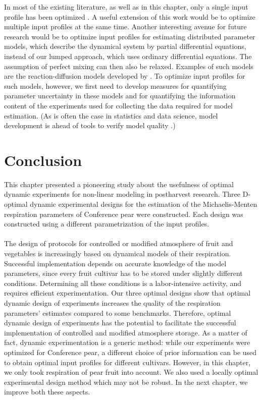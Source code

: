 In most of the existing literature, as well as in this chapter, only a single input profile has been optimized \parencite{bernaerts1,bernaerts2,balsa1,balsa2,nahor1,nahor2}. A useful extension of this work would be to optimize multiple input profiles at the same time. Another interesting avenue for future research would be to optimize input profiles for estimating distributed parameter models, which describe the dynamical system by partial differential equations, instead of our lumped approach, which uses ordinary differential equations. {\color{red}The assumption of perfect mixing can then also be relaxed.} Examples of such models are the reaction-diffusion models developed by \textcite{tri2}. To optimize input profiles for such models, however, we first need to develop measures for quantifying parameter uncertainty in these models and for quantifying the information content of the experiments used for collecting the data required for model estimation. (As is often the case in statistics and data science, model development is ahead of tools to verify model quality \parencite{efronhastie}.)
\section{Conclusion}
This chapter presented a pioneering study about the usefulness of optimal dynamic experiments for non-linear modeling in postharvest research. Three D-optimal dynamic experimental designs for the estimation of the Michaelis-Menten respiration parameters of Conference pear were constructed. Each design was constructed using a different parametrization of the input profiles.
\\
\\
The design of protocols for controlled or modified atmosphere of fruit and vegetables is increasingly based on dynamical models of their respiration. Successful implementation depends on accurate knowledge of the model parameters, since every fruit cultivar has to be stored under slightly different conditions. Determining all these conditions is a labor-intensive activity, and requires efficient experimentation. Our three optimal designs show that optimal dynamic design of experiments increases the quality of the respiration parameters' estimates compared to some benchmarks. Therefore, optimal dynamic design of experiments has the potential to facilitate the successful implementation of controlled and modified atmosphere storage. As a matter of fact, dynamic experimentation is a generic method: while our experiments were optimized for Conference pear, a different choice of prior information can be used to obtain optimal input profiles for different cultivars. However, in this chapter, we only took respiration of pear fruit into account. {\color{red}We also used a locally optimal experimental design method which may not be robust. In the next chapter, we improve both these aspects.}